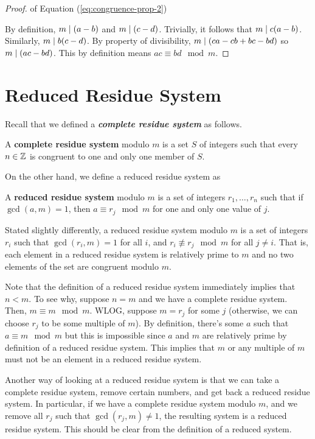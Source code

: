 \begin{proof}
    of Equation (\ref{eq:congruence-prop-2})

    By definition, $m \mathrel{\mid} (a-b)$ and $m \mathrel{\mid} (c-d)$. Trivially, it follows that $m \mathrel{\mid} c(a-b)$. Similarly, $m \mathrel{\mid} b(c-d)$. By property of divisibility, $m \mathrel{\mid} (ca-cb+bc-bd)$ so $m \mathrel{\mid} (ac-bd)$. This by definition means $ac \equiv bd \mod m$.
\end{proof}

\section{Reduced Residue System}

Recall that we defined a \textit{\textbf{complete residue system}} as follows.

\begin{definition}
    A \textbf{complete residue system} modulo $m$ is a set $S$ of integers such that every $n \in \mathbb{Z}$ is congruent to one and only one member of $S$.
\end{definition}

On the other hand, we define a reduced residue system as

\begin{definition}
    A \textbf{reduced residue system} modulo $m$ is a set of integers $r_1, \ldots, r_n$ such that if $\gcd(a,m) = 1$, then $a \equiv r_j \mod m$ for one and only one value of $j$.
\end{definition}

Stated slightly differently, a reduced residue system modulo $m$ is a set of integers $r_i$ such that $\gcd(r_i,m) = 1$ for all $i$, and $r_i \not\equiv r_j \mod m$ for all $j \neq i$. That is, each element in a reduced residue system is relatively prime to $m$ and no two elements of the set are congruent modulo $m$.

Note that the definition of a reduced residue system immediately implies that $n < m$. To see why, suppose $n = m$ and we have a complete residue system. Then, $m \equiv m \mod m$. WLOG, suppose $m = r_j$ for some $j$ (otherwise, we can choose $r_j$ to be some multiple of $m$). By definition, there's some $a$ such that $a \equiv m \mod m$ but this is impossible since $a$ and $m$ are relatively prime by definition of a reduced residue system. This implies that $m$ or any multiple of $m$ must not be an element in a reduced residue system.

Another way of looking at a reduced residue system is that we can take a complete residue system, remove certain numbers, and get back a reduced residue system. In particular, if we have a complete residue system modulo $m$, and we remove all $r_j$ such that $\gcd(r_j, m) \neq 1$, the resulting system is a reduced residue system. This should be clear from the definition of a reduced system.

